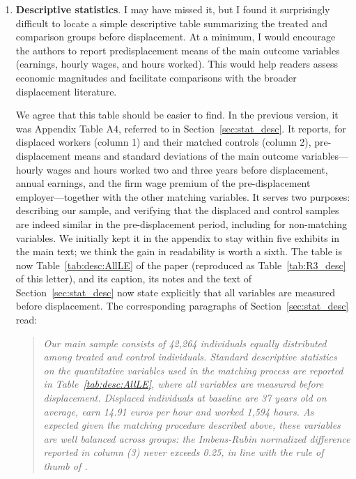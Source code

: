 \documentclass[11pt]{article}
\newcommand{\comment}[1]{\begingroup #1\endgroup}
\newcommand{\answer}[1]{\begingroup\color{navy}#1\endgroup}
\begin{document}
\begin{enumerate}[leftmargin=*]
\item[1.] 
\comment{\textbf{Descriptive statistics}. I may have missed it, but I found it surprisingly difficult to locate a simple descriptive table summarizing the treated and comparison groups before displacement. At a minimum, I would encourage the authors to report predisplacement means of the main outcome variables (earnings, hourly wages, and hours worked). This would help readers assess economic magnitudes and facilitate comparisons with the broader displacement literature.
}\par

\answer{We agree that this table should be easier to find. In the previous version, it was Appendix Table A4, referred to in Section~\ref{sec:stat_desc}. It reports, for displaced workers (column 1) and their matched controls (column 2), pre-displacement means and standard deviations of the main outcome variables---hourly wages and hours worked two and three years before displacement, annual earnings, and the firm wage premium of the pre-displacement employer---together with the other matching variables. It serves two purposes: describing our sample, and verifying that the displaced and control samples are indeed similar in the pre-displacement period, including for non-matching variables. We initially kept it in the appendix to stay within five exhibits in the main text; we think the gain in readability is worth a sixth. The table is now Table~\ref{tab:desc:AllLE} of the paper (reproduced as Table~\ref{tab:R3_desc} of this letter), and its caption, its notes and the text of Section~\ref{sec:stat_desc} now state explicitly that all variables are measured before displacement. The corresponding paragraphs of Section~\ref{sec:stat_desc} read:
\begin{quote}\itshape
Our main sample consists of 42,264 individuals equally distributed among treated and control individuals. Standard descriptive statistics on the quantitative variables used in the matching process are reported in Table~\ref{tab:desc:AllLE}, where all variables are measured before displacement. Displaced individuals at baseline are 37 years old on average, earn 14.91 euros per hour and worked 1,594 hours. As expected given the matching procedure described above, these variables are well balanced across groups: the Imbens-Rubin normalized difference reported in column (3) never exceeds 0.25, in line with the rule of thumb of \citet{rubin_assessing_2015}.


\end{quote}}
\end{enumerate}
\end{document}
